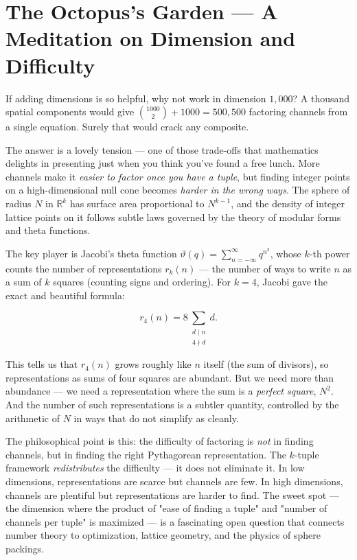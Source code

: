 \bigskip


\section{The Octopus's Garden --- A Meditation on Dimension and Difficulty}

If adding dimensions is so helpful, why not work in dimension $1{,}000$? A thousand spatial components would give $\binom{1000}{2} + 1000 = 500{,}500$ factoring channels from a single equation. Surely that would crack any composite.

The answer is a lovely tension --- one of those trade-offs that mathematics delights in presenting just when you think you've found a free lunch. More channels make it \textit{easier to factor once you have a tuple}, but finding integer points on a high-dimensional null cone becomes \textit{harder in the wrong ways}. The sphere of radius $N$ in $\mathbb{R}^k$ has surface area proportional to $N^{k-1}$, and the density of integer lattice points on it follows subtle laws governed by the theory of modular forms and theta functions.

The key player is Jacobi's theta function $\vartheta(q) = \sum_{n=-\infty}^{\infty} q^{n^2}$, whose $k$-th power counts the number of representations $r_k(n)$ --- the number of ways to write $n$ as a sum of $k$ squares (counting signs and ordering). For $k = 4$, Jacobi gave the exact and beautiful formula:

\[
r_4(n) = 8 \sum_{\substack{d \mid n \\ 4 \nmid d}} d.
\]

This tells us that $r_4(n)$ grows roughly like $n$ itself (the sum of divisors), so representations as sums of four squares are abundant. But we need more than abundance --- we need a representation where the sum is a \textit{perfect square}, $N^2$. And the number of such representations is a subtler quantity, controlled by the arithmetic of $N$ in ways that do not simplify as cleanly.

The philosophical point is this: the difficulty of factoring is \textit{not} in finding channels, but in finding the right Pythagorean representation. The $k$-tuple framework \textit{redistributes} the difficulty --- it does not eliminate it. In low dimensions, representations are scarce but channels are few. In high dimensions, channels are plentiful but representations are harder to find. The sweet spot --- the dimension where the product of "ease of finding a tuple" and "number of channels per tuple" is maximized --- is a fascinating open question that connects number theory to optimization, lattice geometry, and the physics of sphere packings.

